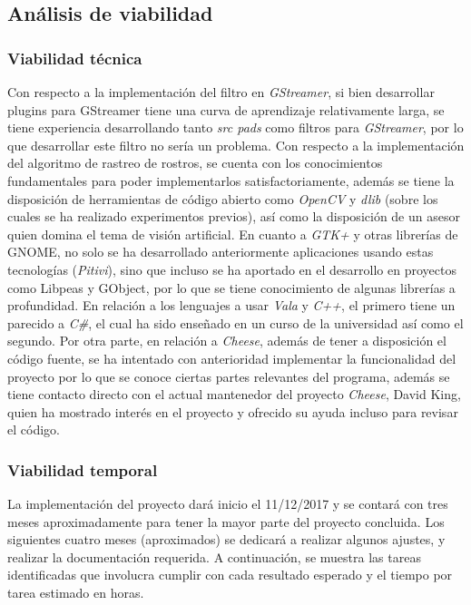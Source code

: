 \documentclass[a4paper,openright,12pt]{report}
\begin{document}
\subsection{Análisis de viabilidad}
\subsubsection{Viabilidad técnica}
Con respecto a la implementación del filtro en \textit{GStreamer}, si bien
desarrollar plugins para GStreamer tiene una curva de aprendizaje relativamente
larga, se tiene experiencia desarrollando tanto \textit{src pads} como filtros
para \textit{GStreamer}, por lo que desarrollar este filtro no sería un
problema. Con respecto a la implementación del algoritmo de rastreo de rostros,
se cuenta con los conocimientos fundamentales para poder implementarlos
satisfactoriamente, además se tiene la disposición de herramientas de código
abierto como \textit{OpenCV} y \textit{dlib} (sobre los cuales se ha realizado
experimentos previos), así como la disposición de un asesor quien domina el tema
de visión artificial. En cuanto a \textit{GTK+} y otras librerías de
GNOME, no solo se ha desarrollado anteriormente aplicaciones usando estas
tecnologías (\textit{Pitivi}), sino que incluso se ha aportado en el desarrollo
en proyectos como Libpeas y \gls{GObject}, por lo que se tiene
conocimiento de algunas librerías a profundidad. En relación a los lenguajes a
usar \textit{Vala} y \textit{C++}, el primero tiene un parecido a \textit{C\#},
el cual ha sido enseñado en un curso de la universidad así como el segundo. Por
otra parte, en relación a \textit{Cheese}, además de tener a disposición el
código fuente, se ha intentado con anterioridad implementar la funcionalidad del
proyecto por lo que se conoce ciertas partes relevantes del programa, además se
tiene contacto directo con el actual mantenedor del proyecto \textit{Cheese},
David King, quien ha mostrado interés en el proyecto y ofrecido su ayuda incluso
para revisar el código.

\subsubsection{Viabilidad temporal}
La implementación del proyecto dará inicio el 11/12/2017 y se contará con tres
meses aproximadamente para tener la mayor parte del proyecto concluida. Los
siguientes cuatro meses (aproximados) se dedicará a realizar algunos ajustes, y
realizar la documentación requerida. A continuación, se muestra las tareas
identificadas que involucra cumplir con cada resultado esperado y el tiempo por
tarea estimado en horas.
\end{document}
